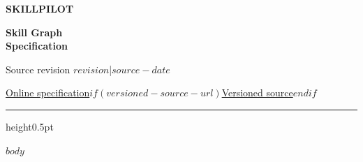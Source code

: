 \documentclass[11pt,a4paper]{article}
\begin{document}
\thispagestyle{empty}
{\sffamily\bfseries\small\color{muted}SKILLPILOT}\par\vspace{7.9mm}
{\sffamily\bfseries\fontsize{29}{37.5}\selectfont\color{ink}Skill Graph\\Specification\par}\vspace{4mm}
{\small\color{muted}Source revision \texttt{$revision$}\quad|\quad $source-date$}\par\vspace{6.67mm}
{\small\href{$source-url$}{Online specification}$if(versioned-source-url)$\quad\textbullet\quad\href{$versioned-source-url$}{Versioned source}$endif$}\par\vspace{12mm}
{\color{rulecolour}\hrule height0.5pt}\vspace{8mm}
{\fontsize{11}{13.22}\selectfont\tableofcontents}
\clearpage
$body$
\end{document}
